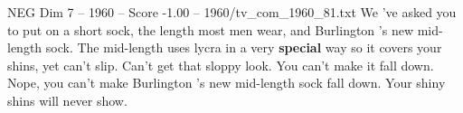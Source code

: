 \begin{textsample}{NEG Dim 7 – 1960 – Score -1.00 – 1960/tv\_com\_1960\_81.txt}  \label{ex:f7_neg_070}
We 've asked you to put on a short sock, the length most men wear, and Burlington 's new mid-length sock.
The mid-length uses lycra in a very \textbf{special} way so it covers your shins, yet can't slip.
Can't get that sloppy look.
You can't make it fall down.
Nope, you can't make Burlington 's new mid-length sock fall down.
Your shiny shins will never show.

\end{textsample}

